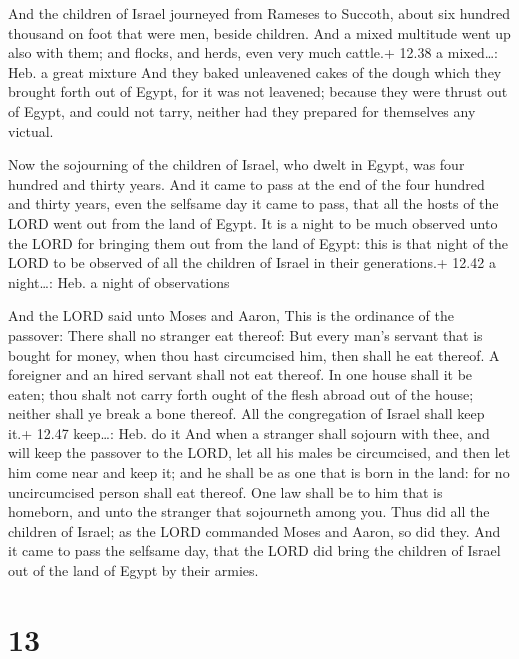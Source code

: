  And the children of Israel journeyed from Rameses to
Succoth, about six hundred thousand on foot that were men, beside
children.  And a mixed multitude went up also with them;
and flocks, and herds, even very much cattle.+ 12.38 a mixed\ldots: Heb.
a great mixture  And they baked unleavened cakes of the
dough which they brought forth out of Egypt, for it was not leavened;
because they were thrust out of Egypt, and could not tarry, neither had
they prepared for themselves any victual.

 Now the sojourning of the children of Israel, who dwelt
in Egypt, was four hundred and thirty years.  And it came
to pass at the end of the four hundred and thirty years, even the
selfsame day it came to pass, that all the hosts of the LORD went out
from the land of Egypt.  It is a night to be much observed
unto the LORD for bringing them out from the land of Egypt: this is that
night of the LORD to be observed of all the children of Israel in their
generations.+ 12.42 a night\ldots: Heb. a night of observations

 And the LORD said unto Moses and Aaron, This is the
ordinance of the passover: There shall no stranger eat thereof:
 But every man's servant that is bought for money, when
thou hast circumcised him, then shall he eat thereof.  A
foreigner and an hired servant shall not eat thereof.  In
one house shall it be eaten; thou shalt not carry forth ought of the
flesh abroad out of the house; neither shall ye break a bone thereof.
 All the congregation of Israel shall keep it.+ 12.47
keep\ldots: Heb. do it  And when a stranger shall sojourn
with thee, and will keep the passover to the LORD, let all his males be
circumcised, and then let him come near and keep it; and he shall be as
one that is born in the land: for no uncircumcised person shall eat
thereof.  One law shall be to him that is homeborn, and
unto the stranger that sojourneth among you.  Thus did all
the children of Israel; as the LORD commanded Moses and Aaron, so did
they.  And it came to pass the selfsame day, that the LORD
did bring the children of Israel out of the land of Egypt by their
armies.

\hypertarget{section-12}{%
\section{13}\label{section-12}}

